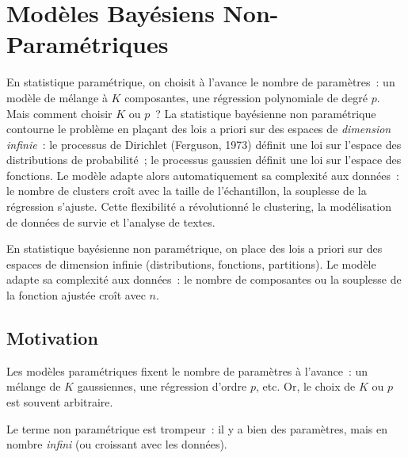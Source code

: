 \chapter{Mod\`eles Bay\'esiens Non-Param\'etriques}
\label{ch:non_parametrique}

En statistique param\'etrique, on choisit \`a l'avance le nombre de param\`etres~: un mod\`ele de m\'elange \`a $K$ composantes, une r\'egression polynomiale de degr\'e $p$. Mais comment choisir $K$ ou $p$~? La statistique bay\'esienne non param\'etrique contourne le probl\`eme en pla\c{c}ant des lois a priori sur des espaces de \emph{dimension infinie}~: le processus de Dirichlet (Ferguson, 1973) d\'efinit une loi sur l'espace des distributions de probabilit\'e~; le processus gaussien d\'efinit une loi sur l'espace des fonctions. Le mod\`ele adapte alors automatiquement sa complexit\'e aux donn\'ees~: le nombre de clusters cro\^it avec la taille de l'\'echantillon, la souplesse de la r\'egression s'ajuste. Cette flexibilit\'e a r\'evolutionn\'e le clustering, la mod\'elisation de donn\'ees de survie et l'analyse de textes.

\begin{intuition}[title=\textbf{Id\'ee centrale}]
En statistique bay\'esienne non param\'etrique, on place des lois a priori
sur des espaces de dimension infinie (distributions, fonctions, partitions).
Le mod\`ele adapte sa complexit\'e aux donn\'ees~: le nombre de composantes
ou la souplesse de la fonction ajust\'ee cro\^it avec $n$.
\end{intuition}

\section{Motivation}

Les mod\`eles param\'etriques fixent le nombre de param\`etres \`a l'avance~:
un m\'elange de $K$ gaussiennes, une r\'egression d'ordre $p$, etc.
Or, le choix de $K$ ou $p$ est souvent arbitraire.

\begin{remarque}
Le terme \og non param\'etrique \fg est trompeur~: il y a bien des
param\`etres, mais en nombre \emph{infini} (ou croissant avec les donn\'ees).
\end{remarque}

